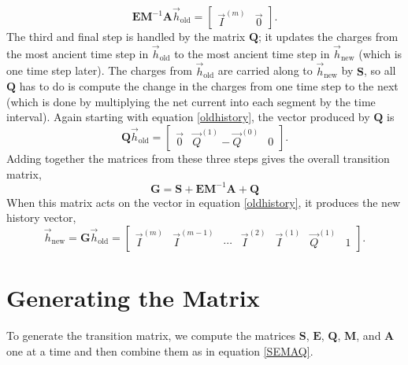 \documentclass{article}
\newcommand{\mat}{\mathbf}
\begin{document}
\begin{equation}
\mat{E}\mat{M}^{-1}\mat{A}\vec{h}_\text{old} = 
\begin{bmatrix}
\vec{I}^{(m)} & \vec{0}
\end{bmatrix}.
\end{equation}
The third and final step is handled by the matrix $\mat{Q}$; it updates the charges from the most ancient time step in $\vec{h}_\text{old}$ to the most ancient time step in $\vec{h}_\text{new}$ (which is one time step later). The charges from $\vec{h}_\text{old}$ are carried along to $\vec{h}_\text{new}$ by $\mat{S}$, so all $\mat{Q}$ has to do is compute the change in the charges from one time step to the next (which is done by multiplying the net current into each segment by the time interval). Again starting with equation \ref{oldhistory}, the vector produced by $\mat{Q}$ is
\begin{equation}
\mat{Q}\vec{h}_\text{old} = 
\begin{bmatrix}
\vec{0} & \vec{Q}^{(1)} - \vec{Q}^{(0)} & 0
\end{bmatrix}.
\end{equation}
Adding together the matrices from these three steps gives the overall transition matrix,
\begin{equation}
\label{SEMAQ}
\mat{G} = \mat{S} + \mat{E}\mat{M}^{-1}\mat{A} + \mat{Q}
\end{equation}
When this matrix acts on the vector in equation \ref{oldhistory}, it produces the new history vector,
\begin{equation}
\vec{h}_\text{new} = \mat{G}\vec{h}_\text{old} = 
\begin{bmatrix}
\vec{I}^{(m)} & \vec{I}^{(m-1)} & \cdots & \vec{I}^{(2)} & \vec{I}^{(1)} & \vec{Q}^{(1)} & 1
\end{bmatrix}.
\end{equation}

\section{Generating the Matrix}
To generate the transition matrix, we compute the matrices $\mat{S}$, $\mat{E}$, $\mat{Q}$, $\mat{M}$, and $\mat{A}$ one at a time and then combine them as in equation \ref{SEMAQ}.
\end{document}
